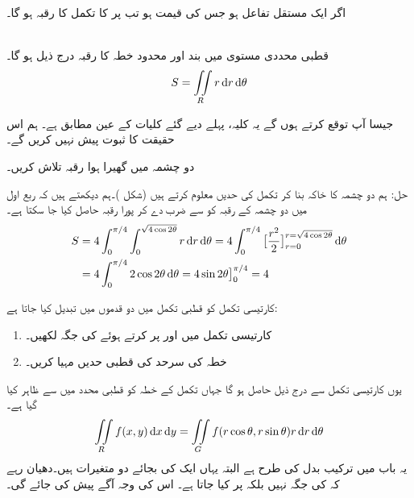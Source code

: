 اگر  ایک مستقل تفاعل ہو جس کی قیمت  ہو  تب  پر  کا تکمل  کا رقبہ ہو گا۔

\\
قطبی محددی مستوی میں بند اور محدود خطہ  کا  رقبہ درج ذیل ہو گا۔
\begin{align}
S=\iint\limits_R r\dif r\dif\theta
\end{align}

جیسا آپ توقع کرتے ہوں گے یہ کلیہ، پہلے دیے گئے کلیات کے عین مطابق ہے۔ ہم اس حقیقت کا ثبوت پیش نہیں کریں گے۔

دو  چشمہ  میں گھیرا ہوا  رقبہ تلاش کریں۔

حل:\quad
ہم دو چشمہ کا خاکہ بنا کر تکمل کی حدیں معلوم کرتے ہیں (شکل )۔ہم دیکھتے ہیں کہ ربع اول میں دو چشمہ کے رقبہ کو  سے ضرب دے کر پورا رقبہ حاصل کیا جا سکتا ہے۔
\begin{align*}
S&=4\int_{0}^{\pi/4}\int_0^{\sqrt{4\cos2\theta}}r\dif r\dif \theta=4\int_0^{\pi/4}\big[\frac{r^2}{2}\big]_{r=0}^{r=\sqrt{4\cos2\theta}}\dif\theta\\
&=4\int_0^{\pi/4}2\cos2\theta\dif\theta=4\sin2\theta\big]_0^{\pi/4}=4
\end{align*}

کارتیسی تکمل  کو قطبی تکمل میں  دو قدموں میں تبدیل کیا جاتا ہے:
\begin{enumerate}[1.]
\item
کارتیسی تکمل میں   اور  پر کرتے ہوئے   کی جگہ  لکھیں۔
\item
خطہ  کی سرحد کی قطبی حدیں مہیا کریں۔
\end{enumerate}
 
یوں کارتیسی تکمل سے درج ذیل حاصل ہو گا جہاں تکمل کے خطہ کو قطبی محدد میں  سے ظاہر کیا گیا ہے۔
\begin{align}\label{مساوات_بالکثرت_قطبی_محدد_میں_رقبہ_کی_عمومی}
\iint\limits_R f(x,y)\dif x\dif y=\iint\limits_G f(r\cos\theta,r\sin\theta)r\dif r\dif \theta
\end{align}
یہ  باب  میں ترکیب بدل کی طرح ہے البتہ یہاں ایک کی بجائے دو متغیرات ہیں۔دھیان رہے کہ  کی جگہ  نہیں بلکہ  پر کیا جاتا ہے۔ اس کی وجہ آگے پیش کی جائے گی۔

